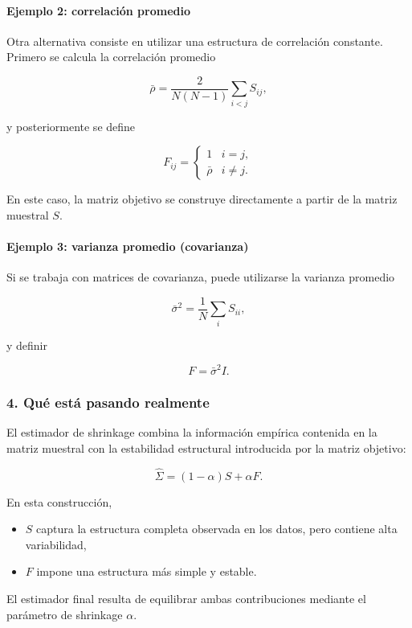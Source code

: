 \documentclass[letterpaper,12pt,oneside]{book}
\begin{document}
\paragraph{Ejemplo 2: correlación promedio}

Otra alternativa consiste en utilizar una estructura de correlación constante. Primero se calcula la correlación promedio

\[
\bar{\rho} =
\frac{2}{N(N-1)}
\sum_{i<j} S_{ij},
\]

y posteriormente se define

\[
F_{ij} =
\begin{cases}
1 & i=j, \\
\bar{\rho} & i \neq j .
\end{cases}
\]

En este caso, la matriz objetivo se construye directamente a partir de la matriz muestral $S$.

\paragraph{Ejemplo 3: varianza promedio (covarianza)}

Si se trabaja con matrices de covarianza, puede utilizarse la varianza promedio

\[
\bar{\sigma}^2 =
\frac{1}{N}
\sum_i S_{ii},
\]

y definir

\[
F = \bar{\sigma}^2 I.
\]

\subsubsection*{4. Qué está pasando realmente}

El estimador de shrinkage combina la información empírica contenida en la matriz muestral con la estabilidad estructural introducida por la matriz objetivo:

\[
\hat{\Sigma} = (1-\alpha)S + \alpha F.
\]

En esta construcción,

\begin{itemize}
\item $S$ captura la estructura completa observada en los datos, pero contiene alta variabilidad,
\item $F$ impone una estructura más simple y estable.
\end{itemize}

El estimador final resulta de equilibrar ambas contribuciones mediante el parámetro de shrinkage $\alpha$.
\end{document}
